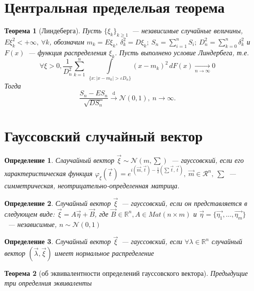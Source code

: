 \documentclass[11pt, a5paper]{article}
\newtheorem{theorem}{Теорема}[section]
\newtheorem{definition}{Определение}
\begin{document}
\section{Центральная пределельая теорема}
	\begin{theorem}[Линдеберга]
	 Пусть $\{\xi_k\}_{k \geqslant 1}$~--- независимые случайные величины, $E\xi_k^2 <+ \infty,~\forall k$, обозначим $m_k=E\xi_k,~\delta_k^2=D\xi_k;~S_n=\sum\limits_{i=1}^{n}S_i;~D_n^2 = \sum\limits_{k=0}^{n}\delta_k^2$ и $F(x)$~--- функция распределения $\xi_k$. Пусть выполнено условие Линдербега, т.е.
	 $$\forall\xi>0,\frac{1}{D_n^2}\sum\limits_{k=1}^{n}~ \int\limits_{\{x:\mid x-m_k\mid >\varepsilon D_n\}} (x-m_k)^2\,dF(x) \xrightarrow[n \rightarrow \infty]{} 0 $$
	 Тогда  $$ \frac{S_n-ES_n}{\sqrt{DS_n}}\overset{\text{d}}{\longrightarrow} \mathcal{N} (0,1),~n \rightarrow \infty.$$
	\end{theorem}
	\section{Гауссовский случайный вектор}
	\begin{definition}
Слаучайный вектор $\vec{\xi} \sim \mathcal{N}(m,\sum)$~--- гауссовский, если его характеристическая функция $\varphi_\xi(\vec{t})=e^{i(\vec{m},\vec{t}) -\frac{1}{2}(\sum\vec{t},\vec{t})},~\vec{m} \in \mathcal{R}^n,~\sum$~--- симметрическая, неотрицательно-определенная матрица.
	\end{definition}
	\begin{definition}
Случайный вектор $\vec{\xi}$~--- гауссовский, если он представляется в следующем виде: $\vec{\xi} = A\vec{\eta} + \vec{B}$, где $\vec{B} \in \mathbb{R}^n,A \in Mat(n \times m)$ и $\vec{\eta} = \{\vec{\eta_1}, \ldots,\vec{\eta_m} \}$~--- независимые, $n \sim \mathcal{N}(0,1)$
	\end{definition}
	\begin{definition}
Случайный вектор $\vec{\xi}$~--- гауссовский, если $\forall \lambda \in \mathbb{R}^n$ случайный вектор $(\vec{\lambda}, \vec{\xi})$ имеет нормальное распределение
	\end{definition}
	\begin{theorem}[об эквивалентности определений гауссовского вектора]
		Предыдущие три определния эквиваленты
	\end{theorem}
\end{document}
